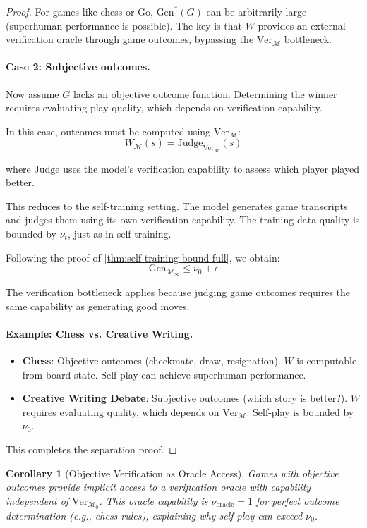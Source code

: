 \documentclass{article}
\newtheorem{corollary}[theorem]{Corollary}
\theoremstyle{definition}
\theoremstyle{remark}
\newcommand{\M}{\mathcal{M}}
\newcommand{\Gen}{\text{Gen}}
\newcommand{\Ver}{\text{Ver}}
\begin{document}
\begin{proof}
For games like chess or Go, \(\Gen^*(G)\) can be arbitrarily large (superhuman performance is possible). The key is that \(W\) provides an external verification oracle through game outcomes, bypassing the \(\Ver_{\M}\) bottleneck.

\paragraph{Case 2: Subjective outcomes.}
Now assume \(G\) lacks an objective outcome function. Determining the winner requires evaluating play quality, which depends on verification capability.

In this case, outcomes must be computed using \(\Ver_{\M}\):
\[
W_\M(s) = \text{Judge}_{\Ver_\M}(s)
\]

where \(\text{Judge}\) uses the model's verification capability to assess which player played better.

This reduces to the self-training setting. The model generates game transcripts and judges them using its own verification capability. The training data quality is bounded by \(\nu_t\), just as in self-training.

Following the proof of \cref{thm:self-training-bound-full}, we obtain:
\[
\Gen_{\M_\infty} \leq \nu_0 + \epsilon
\]

The verification bottleneck applies because judging game outcomes requires the same capability as generating good moves.

\paragraph{Example: Chess vs. Creative Writing.}
\begin{itemize}
\item \textbf{Chess}: Objective outcomes (checkmate, draw, resignation). \(W\) is computable from board state. Self-play can achieve superhuman performance.

\item \textbf{Creative Writing Debate}: Subjective outcomes (which story is better?). \(W\) requires evaluating quality, which depends on \(\Ver_{\M}\). Self-play is bounded by \(\nu_0\).
\end{itemize}

This completes the separation proof.
\end{proof}

\begin{corollary}[Objective Verification as Oracle Access]
\label{cor:objective-oracle}
Games with objective outcomes provide implicit access to a verification oracle with capability independent of \(\Ver_{\M_0}\). This oracle capability is \(\nu_{\text{oracle}} = 1\) for perfect outcome determination (e.g., chess rules), explaining why self-play can exceed \(\nu_0\).
\end{corollary}
\end{document}
